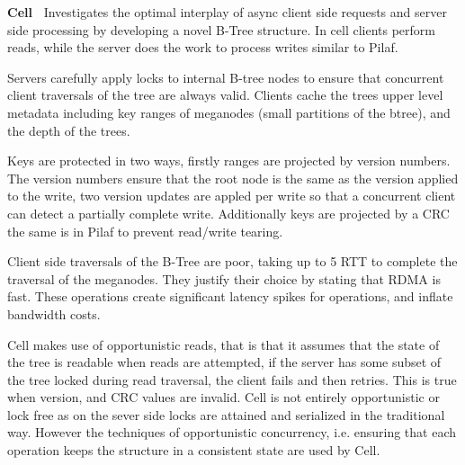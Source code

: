 \textbf{Cell~\cite{cell}} Investigates the optimal interplay of async client
side requests and server side processing by developing a novel B-Tree structure.
In cell clients perform reads, while the server does the work to process writes
similar to Pilaf.

Servers carefully apply locks to internal B-tree nodes to ensure that concurrent
client traversals of the tree are always valid. Clients cache the trees upper
level metadata including key ranges of meganodes (small partitions of the
btree), and the depth of the trees.

Keys are protected in two ways, firstly ranges are projected by version numbers.
The version numbers ensure that the root node is the same as the version applied
to the write, two version updates are appled per write so that a concurrent
client can detect a partially complete write. Additionally keys are projected by
a CRC the same is in Pilaf to prevent read/write tearing.

Client side traversals of the B-Tree are poor, taking up to 5 RTT to complete
the traversal of the meganodes. They justify their choice by stating that RDMA
is fast. These operations create significant latency spikes for operations, and
inflate bandwidth costs.

Cell makes use of opportunistic reads, that is that it assumes that the state of
the tree is readable when reads are attempted, if the server has some subset of
the tree locked during read traversal, the client fails and then retries. This
is true when version, and CRC values are invalid. Cell is not entirely
opportunistic or lock free as on the sever side locks are attained and
serialized in the traditional way. However the techniques of opportunistic
concurrency, i.e. ensuring that each operation keeps the structure in a
consistent state are used by Cell.






